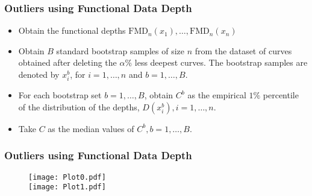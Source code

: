 \documentclass[10pt,dvipsnames,table]{beamer}
\begin{document}
\begin{frame}
\frametitle{Outliers using Functional Data Depth}
\begin{itemize}
\item Obtain the functional depths $\text{FMD}_n(x_1), \dots, \text{FMD}_n(x_n)$
\item Obtain $B$ standard bootstrap samples of size $n$ from the dataset of curves obtained after deleting the $\alpha \%$ less deepest curves. The bootstrap samples are denoted by $x_i^b$, for $i = 1, \dots, n$ and $b = 1, \dots, B$.
\item For each bootstrap set $b = 1, \dots, B$, obtain $C^b$ as the empirical $1\%$ percentile of the distribution of the depths, $D(x_i^b), i = 1, \dots, n$.
\item Take $C$ as the median values of $C^b, b = 1, \dots, B$.
\end{itemize}
\end{frame}

\begin{frame}
\frametitle{Outliers using Functional Data Depth}
\begin{figure}
\texttt{[image: Plot0.pdf]} \\
\texttt{[image: Plot1.pdf]}
\end{figure}
\end{frame}
\end{document}
